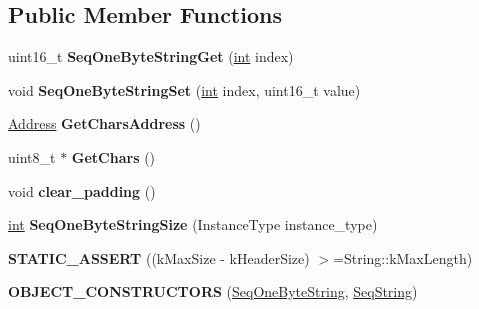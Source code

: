 \subsection*{Public Member Functions}
\begin{DoxyCompactItemize}
\item 
\mbox{\label{classv8_1_1internal_1_1SeqOneByteString_aaa3a16437c74c545b56f8779b2eaf15e}} 
uint16\+\_\+t {\bfseries Seq\+One\+Byte\+String\+Get} (\mbox{\hyperlink{classint}{int}} index)
\item 
\mbox{\label{classv8_1_1internal_1_1SeqOneByteString_ace86c2c7439753b6bb6cb9a370c4ca2e}} 
void {\bfseries Seq\+One\+Byte\+String\+Set} (\mbox{\hyperlink{classint}{int}} index, uint16\+\_\+t value)
\item 
\mbox{\label{classv8_1_1internal_1_1SeqOneByteString_aa393da023be3fd046b02c0ee11aa25db}} 
\mbox{\hyperlink{classuintptr__t}{Address}} {\bfseries Get\+Chars\+Address} ()
\item 
\mbox{\label{classv8_1_1internal_1_1SeqOneByteString_a1a46b1bf7e4321041b3b4b33bb9d2b94}} 
uint8\+\_\+t $\ast$ {\bfseries Get\+Chars} ()
\item 
\mbox{\label{classv8_1_1internal_1_1SeqOneByteString_a6d497331a36a4d4cadb38ebb164e9230}} 
void {\bfseries clear\+\_\+padding} ()
\item 
\mbox{\label{classv8_1_1internal_1_1SeqOneByteString_aa9fa09a5fbd9160f053ba6c0edbd10c2}} 
\mbox{\hyperlink{classint}{int}} {\bfseries Seq\+One\+Byte\+String\+Size} (Instance\+Type instance\+\_\+type)
\item 
\mbox{\label{classv8_1_1internal_1_1SeqOneByteString_ab88bbc4b5823f2feb96efc083720e667}} 
{\bfseries S\+T\+A\+T\+I\+C\+\_\+\+A\+S\+S\+E\+RT} ((k\+Max\+Size -\/ k\+Header\+Size) $>$=String\+::k\+Max\+Length)
\item 
\mbox{\label{classv8_1_1internal_1_1SeqOneByteString_aa4f8dbfb1c5b80e8609a8c0b0ae26f80}} 
{\bfseries O\+B\+J\+E\+C\+T\+\_\+\+C\+O\+N\+S\+T\+R\+U\+C\+T\+O\+RS} (\mbox{\hyperlink{classv8_1_1internal_1_1SeqOneByteString}{Seq\+One\+Byte\+String}}, \mbox{\hyperlink{classv8_1_1internal_1_1SeqString}{Seq\+String}})
\end{DoxyCompactItemize}

